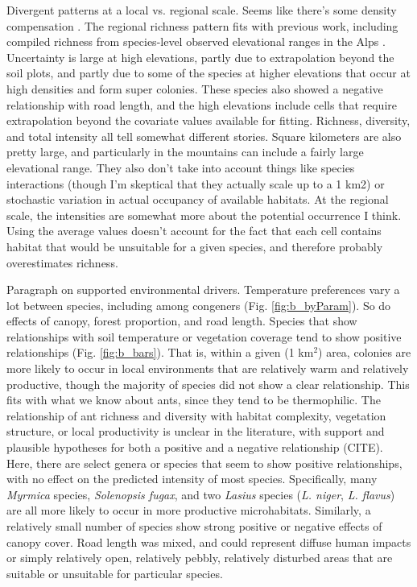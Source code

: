 \documentclass[preprint,review,times,12pt,3p]{elsarticle}
\begin{document}
Divergent patterns at a local vs. regional scale. Seems like there's some density compensation \citep{LongColw2011}. The regional richness pattern fits with previous work, including compiled richness from species-level observed elevational ranges in the Alps \citep{Hellrigl2003,Glaser2006,SzewczykMcCain2016,Szewczyk2018}. Uncertainty is large at high elevations, partly due to extrapolation beyond the soil plots, and partly due to some of the species at higher elevations that occur at high densities and form super colonies. These species also showed a negative relationship with road length, and the high elevations include cells that require extrapolation beyond the covariate values available for fitting. Richness, diversity, and total intensity all tell somewhat different stories. Square kilometers are also pretty large, and particularly in the mountains can include a fairly large elevational range. They also don't take into account things like species interactions (though I'm skeptical that they actually scale up to a 1 km2) or stochastic variation in actual occupancy of available habitats. At the regional scale, the intensities are somewhat more about the potential occurrence I think. Using the average values doesn't account for the fact that each cell contains habitat that would be unsuitable for a given species, and therefore probably overestimates richness.

Paragraph on supported environmental drivers. Temperature preferences vary a lot between species, including among congeners (Fig. \ref{fig:b_byParam}). So do effects of canopy, forest proportion, and road length. Species that show relationships with soil temperature or vegetation coverage tend to show positive relationships (Fig. \ref{fig:b_bars}). That is, within a given (1 km$^2$) area, colonies are more likely to occur in local environments that are relatively warm and relatively productive, though the majority of species did not show a clear relationship. This fits with what we know about ants, since they tend to be thermophilic. The relationship of ant richness and diversity with habitat complexity, vegetation structure, or local productivity is unclear in the literature, with support and plausible hypotheses for both a positive and a negative relationship (CITE). Here, there are select genera or species that seem to show positive relationships, with no effect on the predicted intensity of most species. Specifically, many \emph{Myrmica} species, \emph{Solenopsis fugax}, and two \emph{Lasius} species (\emph{L. niger}, \emph{L. flavus}) are all more likely to occur in more productive microhabitats. Similarly, a relatively small number of species show strong positive or negative effects of canopy cover. Road length was mixed, and could represent diffuse human impacts or simply relatively open, relatively pebbly, relatively disturbed areas that are suitable or unsuitable for particular species.
\end{document}
